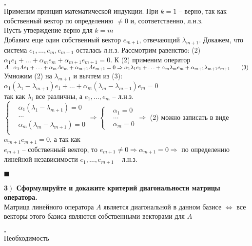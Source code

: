 \documentclass[a4paper,12pt]{article}
\begin{document}
$\square$\\
Применим принцип математической индукции. При $k=1$ -- верно, так как собственный вектор по определению $\ne0$ и, соответственно, л.н.з.\\
Пусть утверждение верно для $k=m$\\
Добавим еще один собственный вектор $e_{m+1}$, отвечающий $\lambda_{m+1}$. Докажем, что система $e_1, \ldots, e_m, e_{m+1}$ осталась л.н.з. Рассмотрим равенство: (2) $\alpha_1e_1+\ldots+\alpha_me_m+\alpha_{m+1}e_{m+1}=0$. К (2) применим оператор $A:\alpha_1Ae_1+\ldots+\alpha_mAe_m+\alpha_{m+1}Ae_{m+1}=0\\
\Rightarrow\alpha_1\lambda_1e_1+\ldots+\alpha_m\lambda_me_m+\alpha_{m+1}\lambda_{m+1}e_{m+1}\qquad(3)$\\
Умножим (2) на $\lambda_{m+1}$ и вычтем из (3):\\
$\alpha_1(\lambda_1-\lambda_{m+1})e_1+\ldots+\alpha_m(\lambda_m-\lambda_{m+1})e_m=0$\\
так как $\lambda_i$ все различны, а $e_1, \ldots, e_m$ -- л.н.з.\\
$\left\lbrace \begin{aligned}
&\alpha_1(\lambda_1-\lambda_{m+1})=0\\
&\ldots\\
&\alpha_m(\lambda_m-\lambda_{m+1})=0\\
\end{aligned}\right. \Rightarrow\left\lbrace \begin{aligned}
&\alpha_1=0\\
&\ldots\\
&\alpha_m=0
\end{aligned}\right. \Rightarrow$ (2) можно записать в виде $\alpha_{m+1}e_{m+1}=0$, а так как \\$e_{m+1}$ -- собственный вектор, то $e_{m+1}\ne 0\Rightarrow\alpha_{m+1}=0\Rightarrow$ по определению линейной независимости $e_1, \ldots, e_{m+1}$ -- л.н.з.
\begin{flushright}
	$\blacksquare$
\end{flushright}
\textbf{3$\left.\right)$ Сформулируйте и докажите критерий диагональности матрицы оператора.}\\Матрица линейного оператора $A$ является диагональной в данном базисе $\Leftrightarrow$ все векторы этого базиса являются собственными векторами для $A$\\\\
$\square$\\
Необходимость\\
\end{document}
